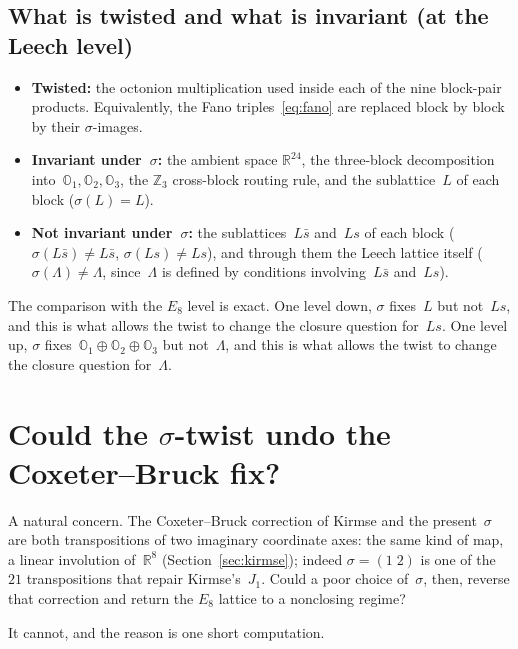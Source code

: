 \documentclass[11pt]{amsart}
\newcommand{\LL}{\Lambda}
\newcommand{\OO}{\mathbb{O}}
\newcommand{\ZZ}{\mathbb{Z}}
\newcommand{\RR}{\mathbb{R}}
\begin{document}
\subsection*{What is twisted and what is invariant (at the Leech
level)}

\begin{itemize}
\item \textbf{Twisted:} the octonion multiplication used inside
  each of the nine block-pair products.  Equivalently, the Fano
  triples~\eqref{eq:fano} are replaced block by block by their
  $\sigma$-images.
\item \textbf{Invariant under~$\sigma$:} the ambient space
  $\RR^{24}$, the three-block decomposition into~$\OO_1, \OO_2,
  \OO_3$, the $\ZZ_3$ cross-block routing rule, and the
  sublattice~$L$ of each block ($\sigma(L) = L$).
\item \textbf{Not invariant under~$\sigma$:} the sublattices~$L\bar s$
  and~$Ls$ of each block ($\sigma(L\bar s) \ne L\bar s$, $\sigma(Ls) \ne Ls$),
  and through them the Leech lattice itself ($\sigma(\LL) \ne \LL$, since~$\LL$
  is defined by conditions involving~$L\bar s$ and~$Ls$).
\end{itemize}

The comparison with the $E_8$ level is exact.  One level down,
$\sigma$ fixes~$L$ but not~$Ls$, and this is what allows the twist
to change the closure question for~$Ls$.  One level up, $\sigma$
fixes~$\OO_1 \oplus \OO_2 \oplus \OO_3$ but not~$\LL$, and this is
what allows the twist to change the closure question for~$\LL$.

\section{Could the $\sigma$-twist undo the Coxeter--Bruck fix?}

A natural concern.  The Coxeter--Bruck correction of Kirmse and the
present~$\sigma$ are both transpositions of two imaginary coordinate
axes: the same kind of map, a linear involution of~$\RR^8$
(Section~\ref{sec:kirmse}); indeed $\sigma = (1\;2)$ is one of the
$21$ transpositions that repair Kirmse's~$J_1$.  Could a poor choice
of~$\sigma$, then, reverse that correction and return the $E_8$
lattice to a nonclosing regime?

It cannot, and the reason is one short computation.
\end{document}
